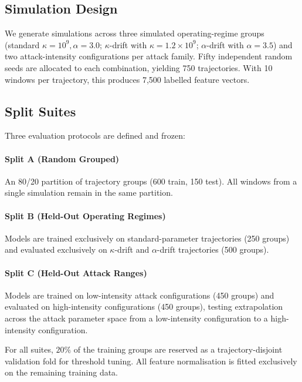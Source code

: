 \documentclass[journal,twocolumn]{IEEEtran}
\newcommand{\kap}{\kappa}
\begin{document}
\subsection{Simulation Design}

We generate simulations across three simulated operating-regime groups (standard $\kap=10^9, \alpha=3.0$; $\kap$-drift with $\kap = 1.2 \times 10^9$; $\alpha$-drift with $\alpha=3.5$) and two attack-intensity configurations per attack family. Fifty independent random seeds are allocated to each combination, yielding 750 trajectories. With 10 windows per trajectory, this produces 7{,}500 labelled feature vectors. 

\subsection{Split Suites}

Three evaluation protocols are defined and frozen:

\paragraph{Split A (Random Grouped)}
An 80/20 partition of trajectory groups (600 train, 150 test). All windows from a single simulation remain in the same partition.

\paragraph{Split B (Held-Out Operating Regimes)}
Models are trained exclusively on standard-parameter trajectories (250 groups) and evaluated exclusively on $\kap$-drift and $\alpha$-drift trajectories (500 groups). 

\paragraph{Split C (Held-Out Attack Ranges)}
Models are trained on low-intensity attack configurations (450 groups) and evaluated on high-intensity configurations (450 groups), testing extrapolation across the attack parameter space from a low-intensity configuration to a high-intensity configuration.

For all suites, $20\%$ of the training groups are reserved as a trajectory-disjoint validation fold for threshold tuning. All feature normalisation is fitted exclusively on the remaining training data.

\end{document}
